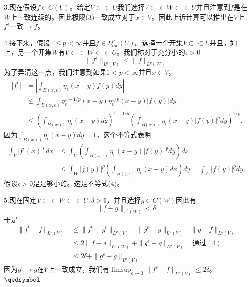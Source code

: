 \documentclass[leqno]{article}%
\begin{document}
\par
3.现在假设$f\in C(U)$。给定$V\subset\subset U$我们选择$V\subset\subset W\subset\subset U$并且注意到$f$是在$W$上一致连续的。因此极限(3)一致成立对于$x\in V$。因此上诉计算可以推出在$V$上$f^{\epsilon}\text{一致}\rightarrow f$。
\par
4.接下来，假设$1\leq p<\infty$并且$f\in L_{loc}^{p}(U)$。选择一个开集$V\subset\subset U$并且，如上，另一个开集$W$有$V\subset\subset W\subset\subset U$。我们称对于充分小的$\epsilon>0$
\begin{equation*}
\|f^{\epsilon}\|_{L^{p}(V)}\leq\|f\|_{L^{p}(W)}.\tag{4}
\end{equation*}
为了弄清这一点，我们注意到如果$1<p<\infty$并且$x\in V$，
\begin{equation*}
\begin{aligned}
|f^{\epsilon}|&=\left|\int_{B(x,\epsilon)}\eta_{\epsilon}(x-y)f(y)dy\right|\\
&\leq\int_{B(x,\epsilon)}\eta_{\epsilon}^{1-1/p}(x-y)\eta_{\epsilon}^{1/p}(x-y)|f(y)|dy\\
&\leq\left(\int_{B(x,\epsilon)}\eta_{\epsilon}(x-y)dy\right)^{1-1/p}\left(\int_{B(x,\epsilon)}\eta_{\epsilon}(x-y)|f(y)|^{p}dy\right)^{1/p}.
\end{aligned}
\end{equation*}
因为$\int_{B(x,\epsilon)}\eta_{\epsilon}(x-y)dy=1$，这个不等式表明
\begin{equation*}
\begin{aligned}
\int_{V}|f^{\epsilon}(x)|^{p}dx&\leq\int_{V}\left(\int_{B(x,\epsilon)}\eta_{\epsilon}(x-y)|f(y)|^{p}dy\right)dx\\
&\leq\int_{W}|f(y)|^{p}\left(\int_{B(y,\epsilon)}\eta_{\epsilon}(x-y)dx\right)dy=\int_{W}|f(y)|^{p}dy,
\end{aligned}
\end{equation*}
假设$\epsilon>0$是足够小的。这是不等式(4)。\par
5.现在固定$V\subset\subset W\subset\subset U,\delta>0$，并且选择$g\in C(W)$因此有
\begin{equation*}
\|f-g\|_{L^{p}(W)}<\delta.
\end{equation*}
于是
\begin{equation*}
\begin{aligned}
\|f^{\epsilon}-f\|_{L^{p}(V)}&\leq\|f^{\epsilon}-g^{\epsilon}\|_{L^{p}(V)}+\|g^{\epsilon}-g\|_{L^{p}(V)}+\|g-f\|_{L^{p}(V)}\\
&\leq 2\|f-g\|_{L^{p}(W)}+\|g^{\epsilon}-g\|_{L^{p}(V)}\quad\text{通过}(4)\\
&\leq
2\delta+\|g^{\epsilon}-g\|_{L^{p}(V)}.
\end{aligned}
\end{equation*}
因为$g^{\epsilon}\rightarrow g$在$V$上一致成立，我们有$\limsup_{\epsilon\rightarrow 0}\|f^{\epsilon}-f\|_{L^{p}(V)}\leq 2\delta$。$\hfill\qedsymbol$
\end{document}
